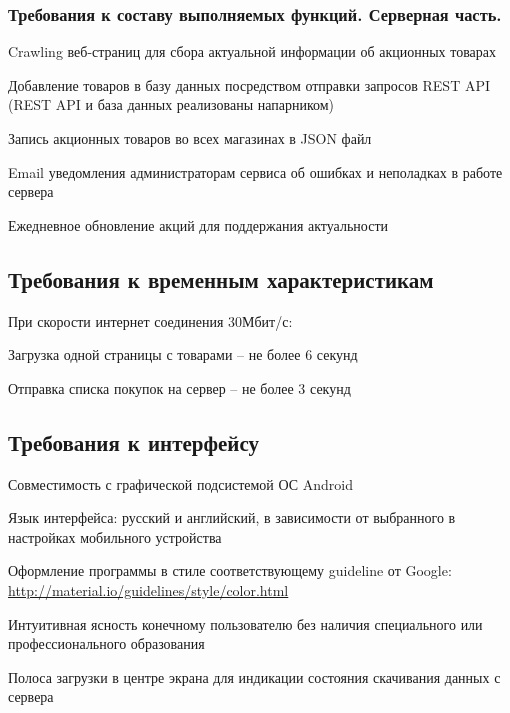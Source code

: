 \subsubsection{Требования к составу выполняемых функций. Серверная часть.}
\begin{my_enumerate}
\item Crawling веб-страниц для сбора актуальной информации об акционных товарах
\item Добавление товаров в базу данных посредством отправки запросов REST API (REST API и база данных реализованы напарником)
\item Запись акционных товаров во всех магазинах в JSON файл
\item Email уведомления администраторам сервиса об ошибках и неполадках в работе сервера
\item Ежедневное обновление акций для поддержания актуальности
\end{my_enumerate}

\subsection{Требования к временным характеристикам}
При скорости интернет соединения 30Мбит/с:
\begin{my_enumerate}
\item Загрузка одной страницы с товарами -- не более 6 секунд
\item Отправка списка покупок на сервер -- не более 3 секунд
\end{my_enumerate}

\subsection{Требования к интерфейсу}
\begin{my_enumerate}
\item Совместимость с графической подсистемой ОС Android {\textregistered}
\item Язык интерфейса: русский и английский, в зависимости от выбранного в настройках мобильного устройства
\item Оформление программы в стиле соответствующему guideline от Google: \url{http://material.io/guidelines/style/color.html}
\item Интуитивная ясность конечному пользователю без наличия специального или профессионального образования
\item Полоса загрузки в центре экрана для индикации состояния скачивания данных с сервера
\end{my_enumerate}

